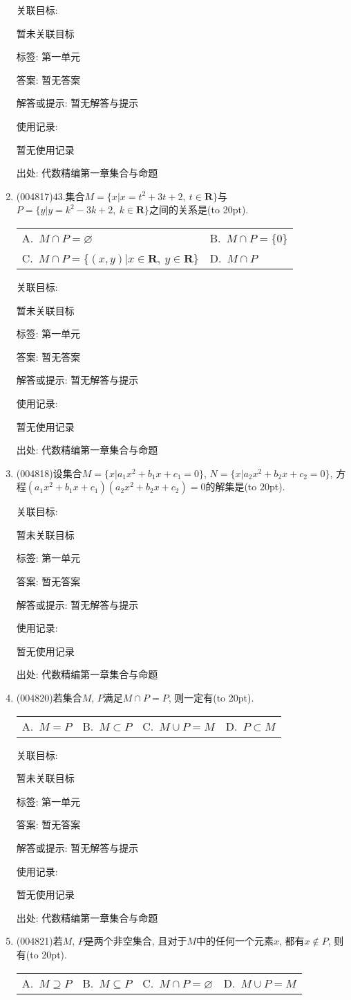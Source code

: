 \documentclass[10pt,a4paper]{article}
\newcommand{\bracket}[1]{(\hbox to #1pt{})}
\newcommand{\twoch}[4]{\par\begin{tabular}{p{.46\textwidth}p{.46\textwidth}}
A.~#1& B.~#2\\
C.~#3& D.~#4
\end{tabular}}
\newcommand{\fourch}[4]{\par\begin{tabular}{p{.23\textwidth}p{.23\textwidth}p{.23\textwidth}p{.23\textwidth}}
A.~#1 &B.~#2& C.~#3& D.~#4
\end{tabular}}
\begin{document}
\begin{enumerate}[1.]
关联目标:

暂未关联目标



标签: 第一单元

答案: 暂无答案

解答或提示: 暂无解答与提示

使用记录:

暂无使用记录


出处: 代数精编第一章集合与命题
\item { (004817)}43.集合$M=\{x |x=t^2+3t+2,\ t\in \mathbf{R}\}$与$P=\{y |y=k^2-3k+2,\ k\in \mathbf{R}\}$之间的关系是\bracket{20}.
\twoch{$M\cap P=\varnothing$}{$M\cap P=\{ 0\}$}{$M\cap P=\{(x,y)|x \in \mathbf{R}, \ y  \in \mathbf{R}\}$}{$M\cap P$}


关联目标:

暂未关联目标



标签: 第一单元

答案: 暂无答案

解答或提示: 暂无解答与提示

使用记录:

暂无使用记录


出处: 代数精编第一章集合与命题
\item { (004818)}设集合$M=\{x|a_1x^2+b_1x+c_1=0\}$, $N=\{x|a_2x^2+b_2x+c_2=0\}$, 方程$(a_1x^2+b_1x+c_1)(a_2x^2+b_2x+c_2)=0$的解集是\bracket{20}.


关联目标:

暂未关联目标



标签: 第一单元

答案: 暂无答案

解答或提示: 暂无解答与提示

使用记录:

暂无使用记录


出处: 代数精编第一章集合与命题
\item { (004820)}若集合$M$, $P$满足$M\cap P=P$, 则一定有\bracket{20}.
\fourch{$M=P$}{$M\subset P$}{$M\cup P=M$}{$P\subset M$}


关联目标:

暂未关联目标



标签: 第一单元

答案: 暂无答案

解答或提示: 暂无解答与提示

使用记录:

暂无使用记录


出处: 代数精编第一章集合与命题
\item { (004821)}若$M$, $P$是两个非空集合, 且对于$M$中的任何一个元素$x$, 都有$x\notin P$, 则有\bracket{20}.
\fourch{$M\supseteq P$}{$M\subseteq P$}{$M\cap P=\varnothing$}{$M\cup P=M$}



\end{enumerate}
\end{document}
